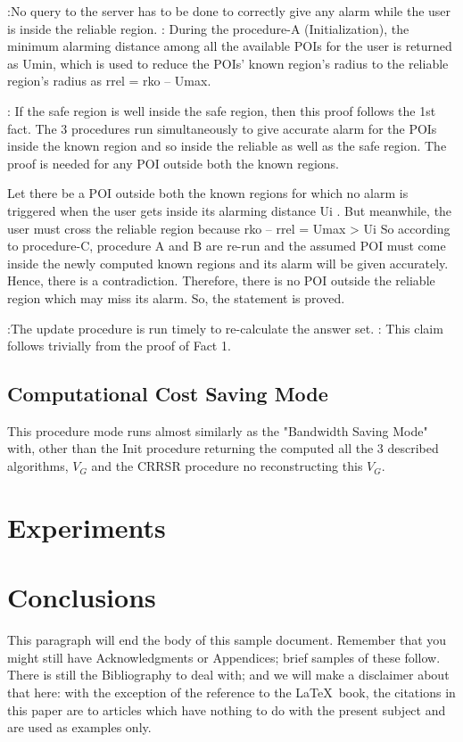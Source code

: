 \documentclass{sig-alternate}
\begin{document}
:No query to the server has to be done to correctly give any alarm while the user is inside the reliable region.
: During the procedure-A (Initialization), the minimum alarming distance among all the available POIs for the user is returned as Umin, which is used to reduce the POIs’ known region’s radius to the reliable region’s radius as rrel = rko – Umax.

: If the safe region is well inside the safe region, then this proof follows the 1st fact.
The 3 procedures run simultaneously to give accurate alarm for the POIs inside the known region and so inside the reliable as well as the safe region.
The proof is needed for any POI outside both the known regions.

Let there be a POI outside both the known regions for which no alarm is triggered when the user gets inside its alarming distance Ui . 
But meanwhile, the user must cross the reliable region because rko – rrel = Umax > Ui 
So according to procedure-C, procedure A and B are re-run and the assumed POI must come inside the newly computed known regions and its alarm will be given accurately.
Hence, there is a contradiction.
Therefore, there is no POI outside the reliable region which may miss its alarm.
So, the statement is proved.

:The update procedure is run timely to re-calculate the answer set.
: This claim follows trivially from the proof of Fact 1.

\subsection{Computational Cost Saving Mode}
This procedure mode runs almost similarly as the "Bandwidth Saving Mode" with, other than the Init procedure returning the computed all the 3 described algorithms, $V_G$ and the CRRSR procedure no reconstructing this $V_G$.

\section{Experiments}


\section{Conclusions}
This paragraph will end the body of this sample document.
Remember that you might still have Acknowledgments or
Appendices; brief samples of these
follow.  There is still the Bibliography to deal with; and
we will make a disclaimer about that here: with the exception
of the reference to the \LaTeX\ book, the citations in
this paper are to articles which have nothing to
do with the present subject and are used as
examples only.
\end{document}
